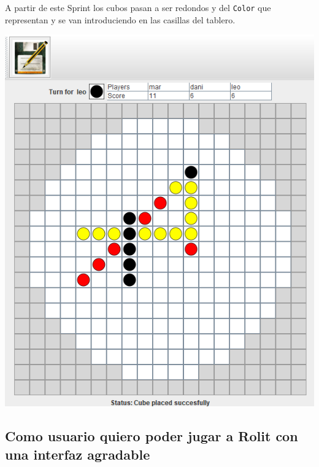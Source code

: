 \documentclass[../DocumentoOficial.tex]{subfiles}
\begin{document}
\begin{sprint}[4]

A partir de este Sprint los cubos pasan a ser redondos y del \texttt{Color} que representan y se van introduciendo en las casillas del tablero.
\begin{center}
\includegraphics[scale=0.85]{cubos-redondos.png}
\end{center}

\end{sprint}
\newpage

\subsection{Como usuario quiero poder jugar a Rolit con una interfaz agradable}
\end{document}
